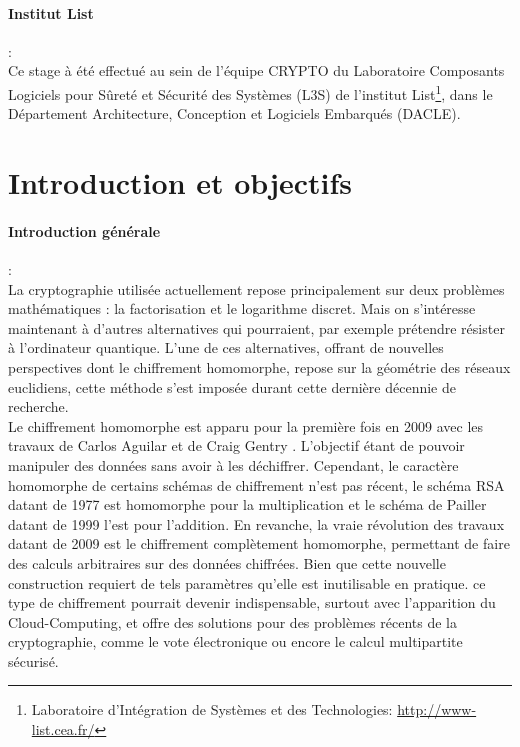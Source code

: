 \documentclass[11pt, headsepline, a4paper, fleqn, oneside]{article}
\begin{document}
\paragraph{Institut List}:\\
Ce stage à été effectué au sein de l'équipe CRYPTO du Laboratoire Composants Logiciels pour Sûreté et Sécurité des Systèmes (L3S) de l'institut List\footnote{Laboratoire d'Intégration de Systèmes et des Technologies: \url{http://www-list.cea.fr/}}, dans le Département Architecture, Conception et Logiciels Embarqués (DACLE).

\section{Introduction et objectifs}

\paragraph{Introduction générale}:\\ 

La cryptographie utilisée actuellement repose principalement sur deux problèmes mathématiques : la factorisation et le logarithme discret. Mais on s'intéresse maintenant à d'autres alternatives qui pourraient, par exemple prétendre résister à l’ordinateur quantique. L'une de ces alternatives, offrant de nouvelles perspectives dont le chiffrement homomorphe, repose sur la géométrie des réseaux euclidiens, cette méthode s'est imposée durant cette dernière décennie de recherche.\\

Le chiffrement homomorphe est apparu pour la première fois en 2009 avec les travaux de Carlos Aguilar et de Craig Gentry \cite{homenc}. L'objectif étant de pouvoir manipuler des données sans avoir à les déchiffrer. Cependant, le caractère homomorphe de certains schémas de chiffrement n'est pas récent, le schéma RSA datant de 1977 est homomorphe pour la multiplication et le schéma de Pailler datant de 1999 l'est pour l'addition. En revanche, la vraie révolution des travaux datant de 2009 est le chiffrement complètement homomorphe, permettant de faire des calculs arbitraires sur des données chiffrées. Bien que cette nouvelle construction requiert de tels paramètres qu'elle est inutilisable en pratique.
ce type de chiffrement pourrait devenir indispensable, surtout avec l'apparition du Cloud-Computing, et offre des solutions pour des problèmes récents de la cryptographie, comme le vote électronique ou encore le calcul multipartite sécurisé.
\end{document}
